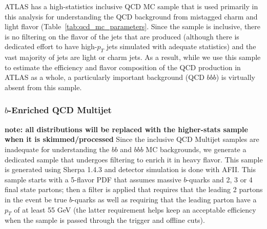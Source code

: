 ATLAS has a high-statistics inclusive QCD MC sample that is used primarily in 
this analysis for understanding the QCD background from 
mistagged charm and light flavor (Table~\ref{tab:qcd_mc_parameters}.  Since 
the sample is inclusive, there is no filtering on the flavor of the jets 
that are produced (although there is dedicated effort to have high-$p_T$ 
jets simulated with adequate statistics) and the vast majority of jets are light or 
charm jets.  As a result, while we use this sample to estimate the 
efficiency and flavor composition of the QCD production in ATLAS as a whole, a 
particularly important background (QCD $bbb$) is virtually absent from this sample.


\subsubsection{$b$-Enriched QCD Multijet}
\label{sec:bb_qcd_mc}
\textbf{note: all distributions will be replaced with the higher-stats sample when
it is skimmed/processed}
Since the inclusive QCD Multijet samples are inadequate for understanding the $bb$ and 
$bbb$ MC backgrounds, we generate a dedicated sample that undergoes filtering to 
enrich it in heavy flavor.  This sample is generated using Sherpa 1.4.3 
\cite{Sherpa} and detector simulation is done with AFII.  This sample 
starts with a 5-flavor PDF that assumes massive $b$-quarks and 
2, 3 or 4 final state partons; then a filter is applied that 
requires that the leading 2 partons in the event be true $b$-quarks 
as well as requiring that the leading parton have a $p_T$ 
of at least 55 GeV (the latter requirement helps keep an acceptable efficiency when 
the sample is passed through the trigger and offline cuts).


